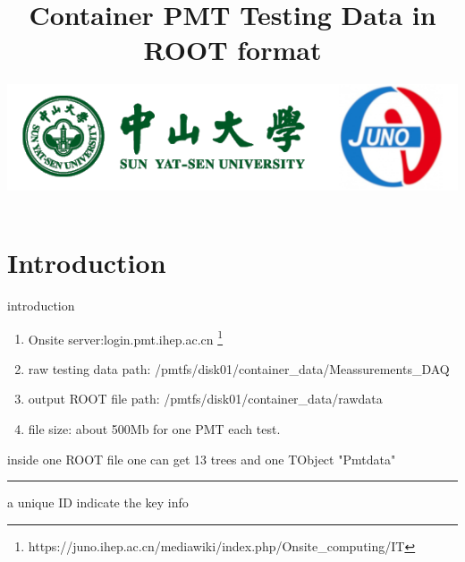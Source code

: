 \documentclass[11pt,compress,xcolor=x11names,UTF8]{beamer}
\title{Container PMT Testing Data in ROOT format}
\author[Rong. Zhao]{Email：zhaor25@mail2.sysu.edu.cn \and  } %
\institute[Sun Yat-Sen University]{School of Physics\and } %
\date[\today]{\includegraphics[width=.5\textwidth]{logo}}
\begin{document}
\maketitle


\section{Introduction}


%
\begin{frame}{ introduction }
	\begin{enumerate}
		\item Onsite server:login.pmt.ihep.ac.cn  \footnote{https://juno.ihep.ac.cn/mediawiki/index.php/Onsite\_computing/IT}
		\item raw testing data path: /pmtfs/disk01/container\_data/Meassurements\_DAQ
		\item output ROOT file path: /pmtfs/disk01/container\_data/rawdata 
		\item file size: about 500Mb for one PMT each test.
	\end{enumerate}
\end{frame}
\begin{frame}{inside one ROOT file}
	one can get 13 trees and one TObject "Pmtdata"
\vspace{.5cm}
\hrule{\textwidth}
\vspace{.5cm}
a unique ID indicate the key info
\vspace{.5cm}
\end{frame}
\end{document}
